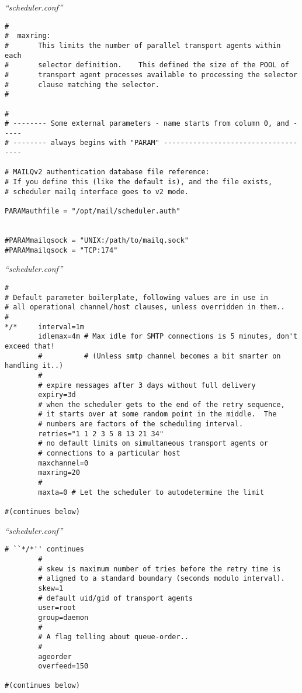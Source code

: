 \documentclass[a4paper,landscape]{slides}
\begin{document}
\begin{overlay}
\small
\centerline{{\em ``scheduler.conf''}}
\tiny
\begin{verbatim}
#
#  maxring:
#       This limits the number of parallel transport agents within each
#       selector definition.    This defined the size of the POOL of
#       transport agent processes available to processing the selector
#       clause matching the selector.
#

#
# -------- Some external parameters - name starts from column 0, and -----
# -------- always begins with "PARAM" ------------------------------------

# MAILQv2 authentication database file reference:
# If you define this (like the default is), and the file exists,
# scheduler mailq interface goes to v2 mode.

PARAMauthfile = "/opt/mail/scheduler.auth"


#PARAMmailqsock = "UNIX:/path/to/mailq.sock"
#PARAMmailqsock = "TCP:174"
\end{verbatim}
\vfill
\end{overlay}
\begin{overlay}
\small
\centerline{{\em ``scheduler.conf''}}
\tiny
\begin{verbatim}
#
# Default parameter boilerplate, following values are in use in
# all operational channel/host clauses, unless overridden in them..
#
*/*     interval=1m
        idlemax=4m # Max idle for SMTP connections is 5 minutes, don't exceed that!
        #          # (Unless smtp channel becomes a bit smarter on handling it..)
        #
        # expire messages after 3 days without full delivery
        expiry=3d
        # when the scheduler gets to the end of the retry sequence,
        # it starts over at some random point in the middle.  The
        # numbers are factors of the scheduling interval.
        retries="1 1 2 3 5 8 13 21 34"
        # no default limits on simultaneous transport agents or
        # connections to a particular host
        maxchannel=0
        maxring=20
        #
        maxta=0 # Let the scheduler to autodetermine the limit

#(continues below)
\end{verbatim}
\vfill
\end{overlay}
\begin{overlay}
\small
\centerline{{\em ``scheduler.conf''}}
\tiny
\begin{verbatim}
# ``*/*'' continues
        #
        # skew is maximum number of tries before the retry time is
        # aligned to a standard boundary (seconds modulo interval).
        skew=1
        # default uid/gid of transport agents
        user=root
        group=daemon
        #
        # A flag telling about queue-order..
        #
        ageorder
        overfeed=150

#(continues below)
\end{verbatim}
\vfill
\end{overlay}
\end{document}
